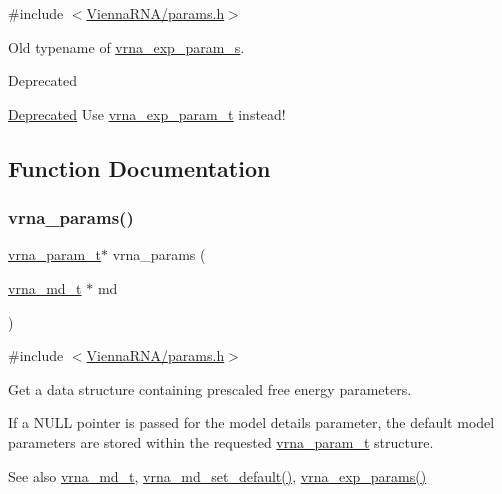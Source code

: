 {\ttfamily \#include $<$\mbox{\hyperlink{params_8h}{Vienna\+R\+N\+A/params.\+h}}$>$}



Old typename of \mbox{\hyperlink{group__energy__parameters_structvrna__exp__param__s}{vrna\+\_\+exp\+\_\+param\+\_\+s}}. 

\begin{DoxyRefDesc}{Deprecated}
\item[\mbox{\hyperlink{deprecated__deprecated000093}{Deprecated}}]Use \mbox{\hyperlink{group__energy__parameters_ga01d8b92fe734df8d79a6169482c7d8d8}{vrna\+\_\+exp\+\_\+param\+\_\+t}} instead! \end{DoxyRefDesc}


\subsection{Function Documentation}
\mbox{\label{group__energy__parameters_gad0e3e7e74bdc50d1709d40c92993185e}} 
\subsubsection{\texorpdfstring{vrna\+\_\+params()}{vrna\_params()}}
{\footnotesize\ttfamily \mbox{\hyperlink{group__energy__parameters_ga8a69ca7d787e4fd6079914f5343a1f35}{vrna\+\_\+param\+\_\+t}}$\ast$ vrna\+\_\+params (\begin{DoxyParamCaption}\item[{\mbox{\hyperlink{group__model__details_ga1f8a10e12a0a1915f2a4eff0b28ea17c}{vrna\+\_\+md\+\_\+t}} $\ast$}]{md }\end{DoxyParamCaption})}



{\ttfamily \#include $<$\mbox{\hyperlink{params_8h}{Vienna\+R\+N\+A/params.\+h}}$>$}



Get a data structure containing prescaled free energy parameters. 

If a N\+U\+LL pointer is passed for the model details parameter, the default model parameters are stored within the requested \mbox{\hyperlink{group__energy__parameters_ga8a69ca7d787e4fd6079914f5343a1f35}{vrna\+\_\+param\+\_\+t}} structure.

\begin{DoxySeeAlso}{See also}
\mbox{\hyperlink{group__model__details_ga1f8a10e12a0a1915f2a4eff0b28ea17c}{vrna\+\_\+md\+\_\+t}}, \mbox{\hyperlink{group__model__details_ga8ac6ff84936282436f822644bf841f66}{vrna\+\_\+md\+\_\+set\+\_\+default()}}, \mbox{\hyperlink{group__energy__parameters_gab1f3016f96aa96bff020cdd904605afa}{vrna\+\_\+exp\+\_\+params()}}
\end{DoxySeeAlso}

